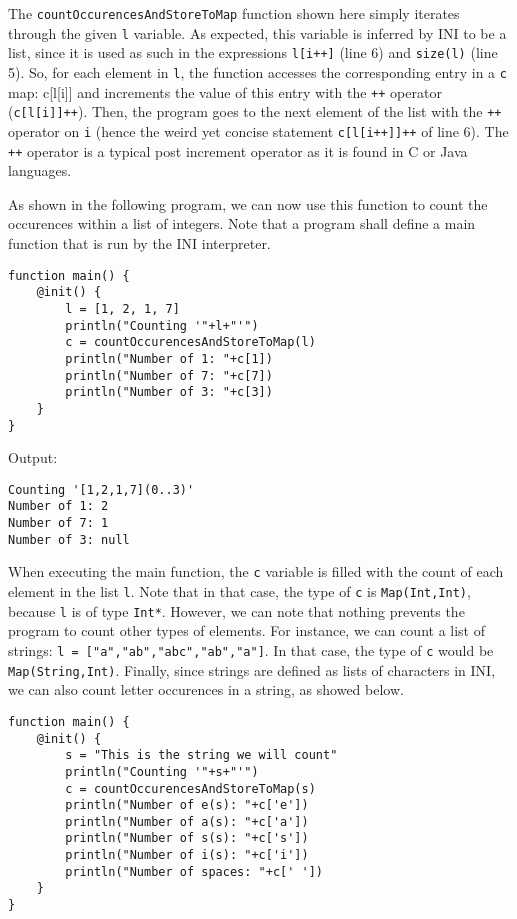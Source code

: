 \documentclass[11pt]{article}
\begin{document}
The \texttt{countOccurencesAndStoreToMap} function shown here simply iterates through the given \texttt{l} variable. As expected, this variable is inferred by INI to be a list, since it is used as such in the expressions \texttt{l[i++]} (line 6) and \texttt{size(l)} (line 5). So, for each element in \texttt{l}, the function accesses the corresponding entry in a \texttt{c} map: c[l[i]] and increments the value of this entry with the \texttt{++} operator (\texttt{c[l[i]]++}). Then, the program goes to the next element of the list with the \texttt{++} operator on \texttt{i} (hence the weird yet concise statement \texttt{c[l[i++]]++} of line 6). The \texttt{++} operator is a typical post increment operator as it is found in C or Java languages.

As shown in the following program, we can now use this function to count the occurences within a list of integers. Note that a program shall define a main function that is run by the INI interpreter.

\begin{lstlisting}
function main() {
	@init() {
		l = [1, 2, 1, 7]
		println("Counting '"+l+"'")
		c = countOccurencesAndStoreToMap(l)
		println("Number of 1: "+c[1])
		println("Number of 7: "+c[7])
		println("Number of 3: "+c[3])
	}
}
\end{lstlisting}

Output:

\begin{lstlisting}[numbers=none]
Counting '[1,2,1,7](0..3)'
Number of 1: 2
Number of 7: 1
Number of 3: null
\end{lstlisting}

When executing the main function, the \texttt{c} variable is filled with the count of each element in the list \texttt{l}. Note that in that case, the type of \texttt{c} is \texttt{Map(Int,Int)}, because \texttt{l} is of type \texttt{Int*}. However, we can note that nothing prevents the program to count other types of elements. For instance, we can count a list of strings: \texttt{l = ["a","ab","abc","ab","a"]}. In that case, the type of \texttt{c} would be \texttt{Map(String,Int)}. Finally, since strings are defined as lists of characters in INI, we can also count letter occurences in a string, as showed below.

\begin{lstlisting}
function main() {
	@init() {
		s = "This is the string we will count"
		println("Counting '"+s+"'")
		c = countOccurencesAndStoreToMap(s)
		println("Number of e(s): "+c['e'])
		println("Number of a(s): "+c['a'])
		println("Number of s(s): "+c['s'])
		println("Number of i(s): "+c['i'])
		println("Number of spaces: "+c[' '])
	}
}
\end{lstlisting}
\end{document}
